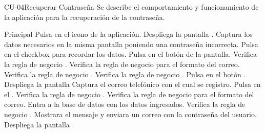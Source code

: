 \begin{UseCase}{CU-04}{Recuperar Contraseña}{
	Se describe el comportamiento y funcionamiento de la aplicación para la recuperación de la contraseña.
}
	\end{UseCase}
	\begin{UCtrayectoria}{Principal}
		\UCpaso[\UCactor] Pulsa en el icono de la aplicación.
		\UCpaso[\UCsist] Despliega la pantalla .
		\UCpaso[\UCactor] Captura los datos necesarios en la misma pantalla poniendo una contraseña incorrecta.
		\UCpaso[\UCactor] Pulsa en el checkbox para recordar los datos.
		\UCpaso[\UCactor] Pulsa en el botón  de la pantalla.
		\UCpaso[\UCsist] Verifica la regla de negocio . 
		\UCpaso[\UCsist] Verifica la regla de negocio   para el formato del correo. 
		\UCpaso[\UCsist] Verifica la regla de negocio . 
		\UCpaso[\UCsist] Verifica la regla de negocio .  
		\UCpaso[\UCactor] Pulsa en el botón .
		\UCpaso[\UCsist] Despliega la pantalla 
		\UCpaso[\UCactor] Captura el correo telefónico con el cual se registro.
		\UCpaso[\UCactor] Pulsa en el  .
		\UCpaso[\UCsist] Verifica la regla de negocio . 
		\UCpaso[\UCsist] Verifica la regla de negocio  para el formato del correo. 
		\UCpaso[\UCsist] Entra a la base de datos con los datos ingresados. 		
		\UCpaso[\UCsist] Verifica la regla de negocio . 
		\UCpaso[\UCsist] Mostrara el mensaje  y enviara un correo con la contraseña del usuario.
		\UCpaso[\UCsist] Despliega la pantalla .
	\end{UCtrayectoria}
